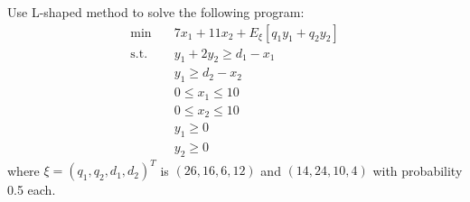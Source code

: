 \documentclass[10pt]{article}
\begin{document}
Use L-shaped method to solve the following program:	
\begin{align*}
    \text{min}  \quad & 
    7x_1 + 11x_2 + E_\xi[q_1y_1 + q_2y_2] \\
    \text{s.t.} \quad &
    y_1 + 2y_2 \geq d_1 - x_1 \\
    & y_1 \geq d_2 - x_2 \\
    & 0 \leq x_1 \leq 10 \\
    & 0 \leq x_2 \leq 10 \\
    & y_1 \geq 0 \\
    & y_2 \geq 0
\end{align*}
where $\xi = (q_1, q_2, d_1, d_2)^T$ is $(26, 16, 6, 12)$ and $(14, 24, 10, 4)$ with probability 0.5 each. 
\end{document}
